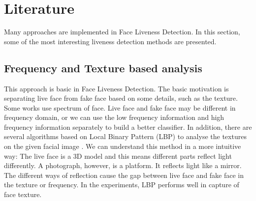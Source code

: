 \documentclass[journal]{IEEEtran}
\begin{document}
%



\section{Literature}

Many approaches are implemented in Face Liveness Detection. In this section, some of the most interesting liveness detection methods are presented.

\subsection{Frequency and Texture based analysis}

This approach is basic in Face Liveness Detection. The basic motivation is separating live face from fake face based on some details, such as the texture. Some works use spectrum of face. Live face and fake face may be different in frequency domain, or we can use the low frequency information and high frequency information separately to build a better classifier. In addition, there are several algorithms based on Local Binary Pattern (LBP) to analyse the textures on the given facial image \cite{chingovska2012effectiveness}\cite{maatta2011face}. We can understand this method in a more intuitive way: The live face is a 3D model and this means different parts reflect light differently. A photograph, however, is a platform. It reflects light like a mirror. The different ways of reflection cause the gap between live face and fake face in the texture or frequency. In the experiments, LBP performs well in capture of face texture.
\end{document}
